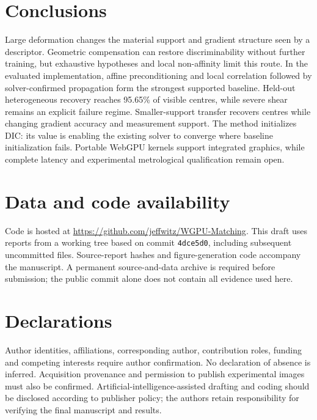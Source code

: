 \documentclass[11pt,a4paper]{article}
\begin{document}
\section{Conclusions}
Large deformation changes the material support and gradient structure seen by a descriptor. Geometric compensation can restore discriminability without further training, but exhaustive hypotheses and local non-affinity limit this route. In the evaluated implementation, affine preconditioning and local correlation followed by solver-confirmed propagation form the strongest supported baseline. Held-out heterogeneous recovery reaches 95.65\% of visible centres, while severe shear remains an explicit failure regime. Smaller-support transfer recovers centres while changing gradient accuracy and measurement support. The method initializes DIC: its value is enabling the existing solver to converge where baseline initialization fails. Portable WebGPU kernels support integrated graphics, while complete latency and experimental metrological qualification remain open.

\section*{Data and code availability}
Code is hosted at \url{https://github.com/jeffwitz/WGPU-Matching}. This draft uses reports from a working tree based on commit \texttt{4dce5d0}, including subsequent uncommitted files. Source-report hashes and figure-generation code accompany the manuscript. A permanent source-and-data archive is required before submission; the public commit alone does not contain all evidence used here.
\section*{Declarations}
Author identities, affiliations, corresponding author, contribution roles, funding and competing interests require author confirmation. No declaration of absence is inferred. Acquisition provenance and permission to publish experimental images must also be confirmed. Artificial-intelligence-assisted drafting and coding should be disclosed according to publisher policy; the authors retain responsibility for verifying the final manuscript and results.


\end{document}
